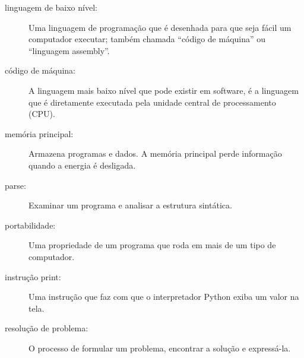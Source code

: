 \begin{description}
\item[linguagem de baixo nível:]  Uma linguagem de programação que é desenhada
para que seja fácil um computador executar; também chamada ``código de máquina'' ou
``linguagem assembly''.
%

\item[código de máquina:]  A linguagem mais baixo nível que pode existir em software, é
a linguagem que é diretamente executada pela unidade central de processamento
(CPU).
%

\item[memória principal:] Armazena programas e dados. A memória principal
perde informação quando a energia é desligada.
%

\item[parse:]  Examinar um programa e analisar a estrutura sintática.
%

\item[portabilidade:]  Uma propriedade de um programa que roda em
mais de um tipo de computador.
%

\item[instrução print:]  Uma instrução que faz com que o interpretador Python
exiba um valor na tela.
%

\item[resolução de problema:]  O processo de formular um problema, encontrar
a solução e expressá-la.
%


\end{description}
